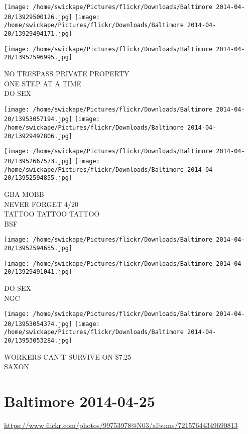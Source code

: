 \documentclass[10pt,letterpaper]{article}
\begin{document}
\texttt{[image: /home/swickape/Pictures/flickr/Downloads/Baltimore 2014-04-20/13929500126.jpg]}
\texttt{[image: /home/swickape/Pictures/flickr/Downloads/Baltimore 2014-04-20/13929494171.jpg]}

\vspace{0.25in}
\texttt{[image: /home/swickape/Pictures/flickr/Downloads/Baltimore 2014-04-20/13952596995.jpg]}

NO TRESPASS PRIVATE PROPERTY\\
ONE STEP AT A TIME\\
DO SEX
\pagebreak

\texttt{[image: /home/swickape/Pictures/flickr/Downloads/Baltimore 2014-04-20/13953057194.jpg]}
\texttt{[image: /home/swickape/Pictures/flickr/Downloads/Baltimore 2014-04-20/13929497806.jpg]}

\texttt{[image: /home/swickape/Pictures/flickr/Downloads/Baltimore 2014-04-20/13952667573.jpg]}
\texttt{[image: /home/swickape/Pictures/flickr/Downloads/Baltimore 2014-04-20/13952594855.jpg]}

GBA MOBB\\
NEVER FORGET 4/20\\
TATTOO TATTOO TATTOO\\
BSF
\pagebreak

\texttt{[image: /home/swickape/Pictures/flickr/Downloads/Baltimore 2014-04-20/13952594655.jpg]}

\vspace{0.25in}
\texttt{[image: /home/swickape/Pictures/flickr/Downloads/Baltimore 2014-04-20/13929491041.jpg]}

DO SEX\\
NGC
\pagebreak

\texttt{[image: /home/swickape/Pictures/flickr/Downloads/Baltimore 2014-04-20/13953054374.jpg]}
\texttt{[image: /home/swickape/Pictures/flickr/Downloads/Baltimore 2014-04-20/13953053284.jpg]}

WORKERS CAN'T SURVIVE ON \$7.25\\
SAXON
\pagebreak

\section*{Baltimore 2014-04-25}

\url{https://www.flickr.com/photos/99753978@N03/albums/72157644349690813}
\end{document}
